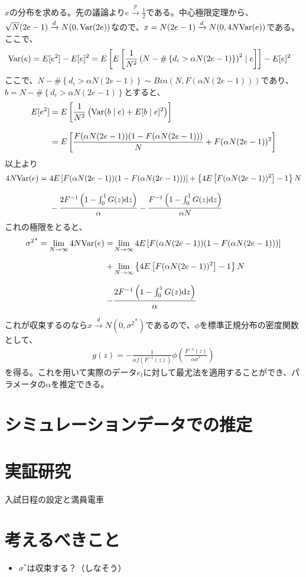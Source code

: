 \documentclass{jsarticle}
\begin{document}
$x$の分布を求める。先の議論より$e \xrightarrow[]{p} \frac{1}{2}$である。中心極限定理から、$\sqrt{N}(2e - 1) \xrightarrow[]{d} N(0, {\rm Var}(2e))$なので、$x = N(2e - 1) \xrightarrow[]{d} N(0, 4N{\rm Var}(e))$である。ここで、
\begin{align*}
	{\rm Var}(e) &= E[e^2] - E[e]^2 = E\left[ E\left[ \frac{1}{N^2} \left( N - \# \left\{ d_i > \alpha N (2e-1) \right\} \right)^2 \mid e \right] \right] - E[e]^2
\end{align*}
ここで、$N - \# \left\{ d_i > \alpha N (2e-1) \right\} \sim Bin(N, F(\alpha N (2e-1)))$であり、$b = N - \# \left\{ d_i > \alpha N (2e-1) \right\}$とすると、
\begin{align*}
	E[e^2] &= E\left[ \frac{1}{N^2} \left( {\rm Var}(b \mid e) + E[b \mid e]^2 \right) \right]\\[8pt]
	&= E\left[ \frac{F(\alpha N (2e-1)) (1 - F(\alpha N (2e-1)))}{N} + F(\alpha N (2e-1))^2 \right]
\end{align*}
以上より
\begin{align*}
	4N{\rm Var}(e) =\ &4E\left[F(\alpha N (2e-1)) (1 - F(\alpha N (2e-1)))\right] + \left\{ 4E\left[ F(\alpha N (2e-1))^2 \right]- 1\right\}N\\[8pt]
	& - \frac{2F^{-1}\left( 1 - \int_0^1 G(z) \mathrm{d}z \right)}{\alpha} - \frac{F^{-1}\left( 1 - \int_0^1 G(z) \mathrm{d}z \right)}{\alpha N}
\end{align*}
これの極限をとると、
\begin{align*}
	{\sigma^2}^* = \lim_{N \to \infty} 4N{\rm Var}(e) = &\lim_{N \to \infty} 4E\left[F(\alpha N (2e-1)) (1 - F(\alpha N (2e-1)))\right]\\[8pt]
	 + &\lim_{N \to \infty} \left\{ 4E\left[ F(\alpha N (2e-1))^2 \right]- 1\right\}N\\[8pt]
	  - &\frac{2F^{-1}\left( 1 - \int_0^1 G(z) \mathrm{d}z \right)}{\alpha}
\end{align*}

これが収束するのなら$x  \xrightarrow[]{d} N(0, {\sigma^2}^*)$であるので、$\phi$を標準正規分布の密度関数として、
\begin{align*}
	g(z) = -\frac{1}{\alpha f \left(F^{-1}(z)\right)} \phi \left( \frac{F^{-1}(z)}{\alpha \sigma^*} \right) 
\end{align*}
を得る。これを用いて実際のデータ${e_t}$に対して最尤法を適用することができ、パラメータの$\alpha$を推定できる。

\section{シミュレーションデータでの推定}

\section{実証研究}
入試日程の設定と満員電車

\section{考えるべきこと}
\begin{itemize}
	\item $\sigma^*$は収束する？（しなそう）
\end{itemize}
\end{document}
